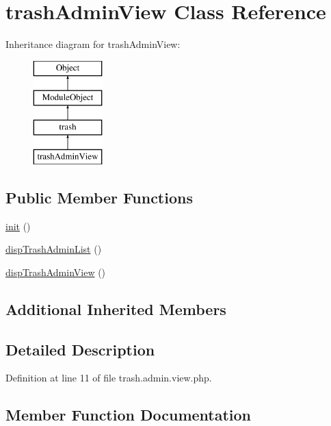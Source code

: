 \hypertarget{classtrashAdminView}{}\section{trash\+Admin\+View Class Reference}
\label{classtrashAdminView}
Inheritance diagram for trash\+Admin\+View\+:\begin{figure}[H]
\begin{center}
\leavevmode
\includegraphics[height=4.000000cm]{classtrashAdminView}
\end{center}
\end{figure}
\subsection*{Public Member Functions}
\begin{DoxyCompactItemize}
\item 
\hyperlink{classtrashAdminView_a471722f4a946b3eff0992c48f268d7eb}{init} ()
\item 
\hyperlink{classtrashAdminView_afb1f31836be3cfeda1d8b9e1f5ec9ee0}{disp\+Trash\+Admin\+List} ()
\item 
\hyperlink{classtrashAdminView_a77a13f0633df48ee6802c706d8ccf1de}{disp\+Trash\+Admin\+View} ()
\end{DoxyCompactItemize}
\subsection*{Additional Inherited Members}


\subsection{Detailed Description}


Definition at line 11 of file trash.\+admin.\+view.\+php.



\subsection{Member Function Documentation}
\hypertarget{classtrashAdminView_afb1f31836be3cfeda1d8b9e1f5ec9ee0}{}\label{classtrashAdminView_afb1f31836be3cfeda1d8b9e1f5ec9ee0} 
